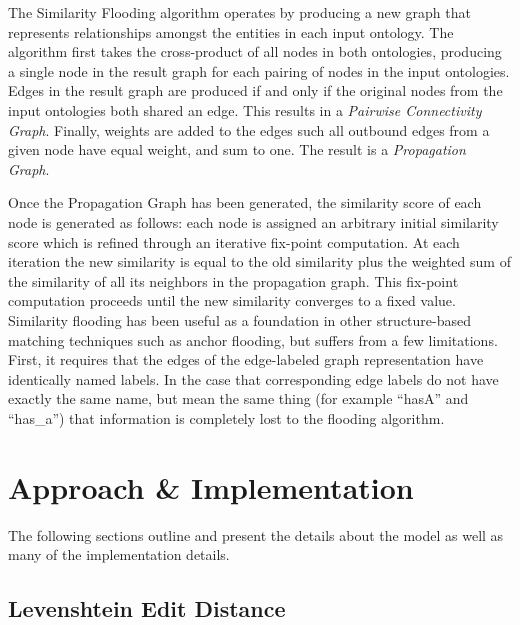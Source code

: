 \documentclass[letterpaper,twocolumn,12pt]{article}
\begin{document}
The Similarity Flooding algorithm operates by producing a new graph that represents relationships amongst the entities in each input ontology. 
The algorithm first takes the cross-product of all nodes in both ontologies, producing a single node in the result graph for each pairing of nodes in the input ontologies. 
Edges in the result graph are produced if and only if the original nodes from the input ontologies both shared an edge. 
This results in a \textit{Pairwise Connectivity Graph}.
Finally, weights are added to the edges such all outbound edges from a given node have equal weight, and sum to one. 
The result is a \textit{Propagation Graph}.

Once the Propagation Graph has been generated, the similarity score of each node is generated as follows: each node is assigned an arbitrary initial similarity
score which is refined through an iterative fix-point computation. 
At each iteration the new similarity is equal to the old similarity plus the weighted sum of the similarity of all its neighbors in the propagation graph. 
This fix-point computation proceeds until the new similarity converges to a fixed value.
%
Similarity flooding has been useful as a foundation in other structure-based matching techniques such as anchor flooding, but suffers from a few limitations. 
First, it requires that the edges of the edge-labeled graph representation have identically named labels. 
In the case that corresponding edge labels do not have exactly the same name, but mean the same thing (for example ``hasA'' and ``has\_a'') that information is completely lost to the flooding algorithm. 


\section{Approach \& Implementation}
\label{sec:approach}

The following sections outline and present the details about the model as well as many of the implementation details.

\subsection{Levenshtein Edit Distance}
\end{document}
